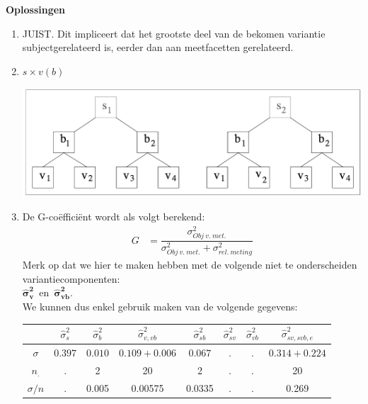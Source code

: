 \OPLOSSING
{
\textbf{Oplossingen}
\begin{enumerate}
\item JUIST. Dit impliceert dat het grootste deel van de bekomen variantie subjectgerelateerd is, eerder dan aan meetfacetten gerelateerd.
\item $s \times v(b)$
\begin{center}
\includegraphics[scale=0.3]{sxvb.png}
\end{center}
\newpage
\item De G-co\"{e}ffici\"{e}nt wordt als volgt berekend:\\
	\begin{align}
		G &=\dfrac{\sigma^2_{Obj~v.~met.}}{\sigma^2_{Obj~v.~met.}+ \sigma^2_{rel.~meting}} \label{eq.G1}
	\end{align}
	Merk op dat we hier te maken hebben met de volgende niet te onderscheiden variantiecomponenten:~ \\
	$ \bm{\hat{\sigma}^2_{v}} $~en~$\bm{\hat{\sigma}^2_{vb} }$.\\
	We kunnen dus enkel gebruik maken van de volgende gegevens: \\
	\begin{tabular}{|c|c|c|c|c|c|c|c|} \hline
	 & $ \hat{\sigma}^2_{s}$ & $ \hat{\sigma}^2_{b} $& $ \hat{\sigma}^2_{v,vb} $ & $ \hat{\sigma}^2_{sb}$ & $\hat{\sigma}^2_{sv} $ & $ \hat{\sigma}^2_{vb} $& $ \hat{\sigma}^2_{sv, svb, e} $ \\ \hline
	$\sigma$  			& $ 0.397 $ 			& $ 0.010 $ 			& $0.109+0.006  $ 			& $ 0.067 $				 & $. $	& $ . $& $ 0.314 + 0.224  $ \\
	$n_.$				& .						& 2					& 20				 		& 2			  		 & $. $	& $ . $&  20 \\ \hline
	$\sigma / n$ 		& .						& 0.005				& 0.00575				 		& 0.0335			  	 & $. $	& $ . $&  0.269 \\ \hline
	\end{tabular} \\


\end{enumerate}}
